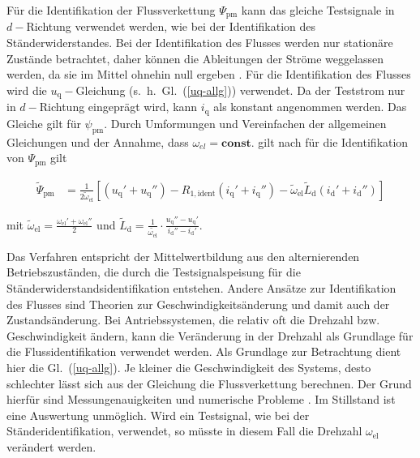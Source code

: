 \documentclass[conference,twocolumn]{IEEEtran}
\newcommand{\x}[1]{\mathrm{#1}}
\begin{document}
Für die Identifikation der Flussverkettung $\Psi_\x{pm}$ kann das gleiche Testsignale in $d-$Richtung verwendet werden, wie bei der Identifikation des Ständerwiderstandes.
Bei der Identifikation des Flusses werden nur stationäre Zustände betrachtet, daher können die Ableitungen der Ströme weggelassen werden, da sie im Mittel ohnehin null ergeben \autocite{Kellner2012}.
Für die Identifikation des Flusses wird die $u_\x{q}-$Gleichung (s.~h.~Gl.~(\ref{uq-allg})) verwendet.
Da der Teststrom nur in $d-$Richtung eingeprägt wird, kann $i_\x{q}$ als konstant angenommen werden.
Das Gleiche gilt für $\psi_\x{pm}$.
Durch Umformungen und Vereinfachen der allgemeinen Gleichungen und der Annahme, dass $\omega_{el}=\textbf{const.}$ gilt nach \textcite{Kellner2012} für die Identifikation von $\Psi_\x{pm}$ gilt

\begin{small}
\begin{align}
\tilde{\Psi}_\x{pm} &= \frac{1}{2\tilde{\omega}_\x{el}} [(u_\x{q}' + u_\x{q}'') - R_\x{1,ident}(i_\x{q}' + i_\x{q}'')-\tilde{\omega}_\x{el}\tilde{L}_\x{d}(i_\x{d}' + i_\x{d}'')]
\end{align}
\end{small}

mit $\tilde{\omega}_\x{el}=\frac{\omega_\x{el}'+\omega_\x{el}''}{2}$ und $\tilde{L}_\x{d} = \frac{1}{\tilde{\omega_\x{el}}}\cdot \frac{u_\x{q}'' - u_\x{q}'}{i_\x{d}''-i_\x{d}'}$.

Das Verfahren entspricht der Mittelwertbildung aus den alternierenden Betriebszuständen, die durch die Testsignalspeisung für die Ständerwiderstandsidentifikation entstehen.
Andere Ansätze zur Identifikation des Flusses sind Theorien zur Geschwindigkeitsänderung und damit auch der Zustandsänderung.
Bei Antriebssystemen, die relativ oft die Drehzahl bzw. Geschwindigkeit ändern, kann die Veränderung in der Drehzahl als Grundlage für die Flussidentifikation verwendet werden.
Als Grundlage zur Betrachtung dient hier die Gl.~(\ref{uq-allg}).
Je kleiner die Geschwindigkeit des Systems, desto schlechter lässt sich aus der Gleichung die Flussverkettung berechnen.
Der Grund hierfür sind Messungenauigkeiten und numerische Probleme \autocite{knorrenschild2}.
Im Stillstand ist eine Auswertung unmöglich.
Wird ein Testsignal, wie bei der Ständeridentifikation, verwendet, so müsste in diesem Fall die Drehzahl $\omega_\x{el}$ verändert werden.
\end{document}
